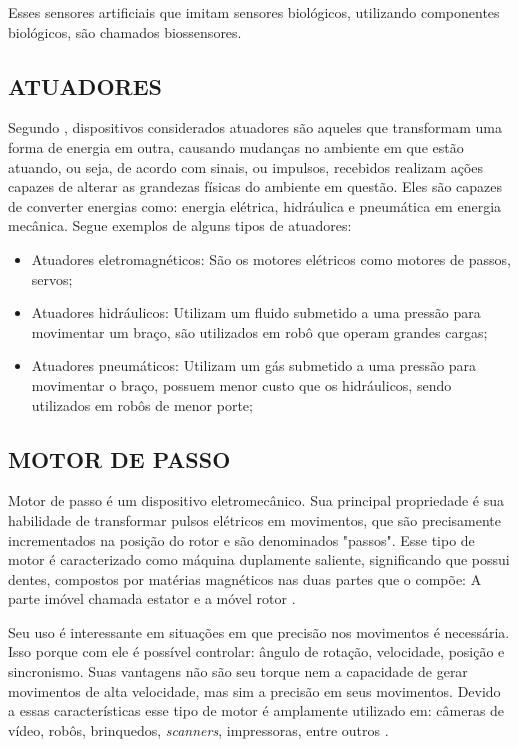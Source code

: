 Esses sensores artificiais que imitam sensores biológicos, utilizando componentes biológicos, são chamados biossensores.

\subsection{ATUADORES}
Segundo \cite{chironis1991mechanisms}, dispositivos considerados atuadores são aqueles que transformam uma forma de energia em outra, causando mudanças no ambiente em que estão atuando, ou seja, de acordo com sinais, ou impulsos, recebidos realizam ações capazes de alterar as grandezas físicas do ambiente em questão. Eles são capazes de converter energias como: energia elétrica, hidráulica e pneumática em energia mecânica. Segue exemplos de alguns tipos de atuadores:

\begin{itemize}
\item Atuadores eletromagnéticos: São os motores elétricos como motores de passos, servos;
\item Atuadores hidráulicos: Utilizam um fluido submetido a uma pressão para movimentar um braço, são utilizados em robô que operam grandes cargas;
\item Atuadores pneumáticos: Utilizam um gás submetido a uma pressão para movimentar o braço, possuem menor custo que os hidráulicos, sendo utilizados em robôs de menor porte;
\end{itemize}

\subsection{MOTOR DE PASSO}
Motor de passo é um dispositivo eletromecânico. Sua principal propriedade é sua habilidade de transformar pulsos elétricos em movimentos, que são precisamente incrementados na posição do rotor e são denominados "passos". Esse tipo de motor é caracterizado como máquina duplamente saliente, significando que possui dentes, compostos por matérias magnéticos nas duas partes que o compõe: A parte imóvel chamada estator e a móvel rotor \cite{demotor, acarnley2002stepping}.

Seu uso é interessante em situações em que precisão nos movimentos é necessária. Isso porque com ele é possível controlar: ângulo de rotação, velocidade, posição e sincronismo. Suas vantagens não são seu torque nem a capacidade de gerar movimentos de alta velocidade, mas sim a precisão em seus movimentos. Devido a essas características esse tipo de motor é amplamente utilizado em: câmeras de vídeo, robôs, brinquedos, \emph{scanners}, impressoras, entre outros \cite{demotor}.

